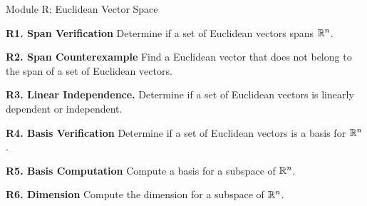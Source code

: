 
\begin{module}{Module R: Euclidean Vector Space}

\begin{moduleStandards}
  \item \textbf{R1. Span Verification}
        Determine if a set of Euclidean vectors spans \(\mathbb{R}^n\).
  \item \textbf{R2. Span Counterexample}
        Find a Euclidean vector that does not belong to the span of a set
        of Euclidean vectors.
  \item \textbf{R3. Linear Independence.}
        Determine if a set of Euclidean vectors is linearly dependent or
        independent.
  \item \textbf{R4. Basis Verification}
        Determine if a set of Euclidean vectors is a basis for \(\mathbb{R}^n\).
  \item \textbf{R5. Basis Computation}
        Compute a basis for a subspace of \(\mathbb{R}^n\).
  \item \textbf{R6. Dimension}
        Compute the dimension for a subspace of \(\mathbb{R}^n\).
\end{moduleStandards}





\end{module}
